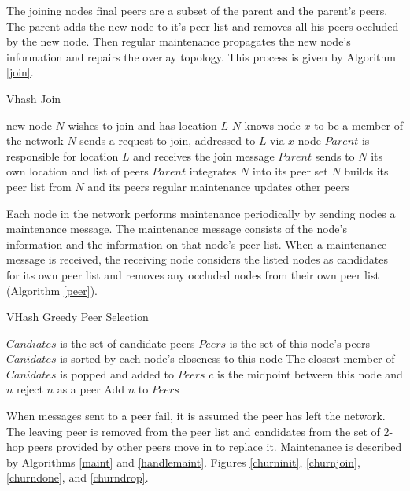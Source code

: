 \documentclass[11pt]{IEEEtran} %
\begin{document}
The joining nodes final peers are a subset of the parent and the parent's peers. The parent adds the new node to it's peer list and removes all his peers occluded by the new node.  Then regular maintenance propagates the new node's information and repairs the overlay topology.  This process is given by Algorithm \ref{join}.

\begin{algorithm}
\caption{Vhash Join}
\label{join}
\begin{algorithmic}[1]  %
\STATE new node $N$ wishes to join and has location $L$
\STATE $N$ knows node $x$ to be a member of the network
\STATE $N$ sends a request to join, addressed to $L$ via $x$
\STATE node $Parent$ is responsible for location $L$ and receives the join message
\STATE $Parent$ sends to $N$ its own location and list of peers
\STATE $Parent$ integrates $N$ into its peer set
\STATE $N$ builds its peer list from $N$ and its peers
\STATE regular maintenance updates other peers
\end{algorithmic}
\end{algorithm}




Each node in the network performs maintenance periodically by sending nodes a maintenance message. The maintenance message consists of the node's information and the information on that node's peer list. When a maintenance message is received, the receiving node considers the listed nodes as candidates for its own peer list and removes any occluded nodes from their own peer list (Algorithm \ref{peer}). 


\begin{algorithm}
\caption{VHash Greedy Peer Selection}
\label{peer}
\begin{algorithmic}[1]  %
	\STATE $Candiates$ is the set of candidate peers
    \STATE $Peers$ is the set of this node's peers
    \STATE $Canidates$ is sorted by each node's closeness to this node
    \STATE The closest member of $Canidates$ is popped and added to $Peers$
    	\STATE $c$ is the midpoint between this node and $n$
        	\STATE reject $n$ as a peer
        \ELSE
        	\STATE Add $n$ to $Peers$
        \ENDIF
    \ENDFOR
\end{algorithmic}
\end{algorithm}



When messages sent to a peer fail, it is assumed the peer has left the network. The leaving peer is removed from the peer list and candidates from the set of 2-hop peers provided by other peers move in to replace it.  Maintenance is described by Algorithms \ref{maint} and \ref{handlemaint}.  Figures \ref{churninit}, \ref{churnjoin}, \ref{churndone}, and \ref{churndrop}.
\end{document}

